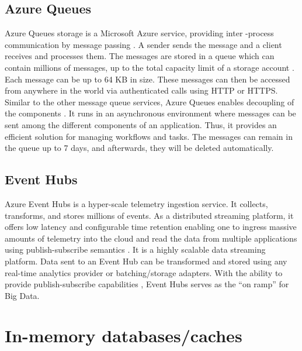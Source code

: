 \subsection{Azure Queues}

     Azure Queues storage is a Microsoft Azure service, providing inter
     -process communication by message passing
     \cite{silberschatz1998operating}.  A sender sends the message
     and a client receives and processes them.  The messages are
     stored in a queue which can contain millions of messages, up to
     the total capacity limit of a storage account
     \cite{www-azurequeue-web}.  Each message can be up to 64 KB in
     size. These messages can then be accessed from anywhere in the
     world via authenticated calls using HTTP or HTTPS. Similar to the
     other message queue services, Azure Queues enables decoupling of
     the components \cite{www-tutorialspoint}. It runs in an
     asynchronous environment where messages can be sent among the
     different components of an application. Thus, it provides an
     efficient solution for managing workflows and tasks. The messages
     can remain in the queue up to 7 days, and afterwards, they will
     be deleted automatically.

\subsection{Event Hubs}

     Azure Event Hubs is a hyper-scale telemetry ingestion service. It
     collects, transforms, and stores millions of events. As a
     distributed streaming platform, it offers low latency and
     configurable time retention enabling one to ingress massive
     amounts of telemetry into the cloud and read the data from
     multiple applications using publish-subscribe
     semantics \cite{www-eventhubs}. It is a highly scalable data
     streaming platform. Data sent to an Event Hub can be transformed
     and stored using any real-time analytics provider or
     batching/storage adapters. With the ability to provide
     publish-subscribe capabilities , Event Hubs serves as the ``on
     ramp'' for Big Data.

     \pv

\section{In-memory databases/caches}
\label{S:o-db-memory}


